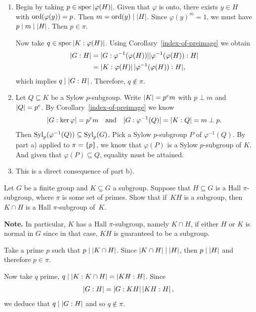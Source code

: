 \begin{solution}
\begin{enumerate}[\upshape a)]
    \item Begin by taking $p\in\operatorname{spec}\left\vert{\varphi(H)}\right\vert$. Given that $\varphi$ is onto, there exists $y\in H$ with ${\rm ord}(\varphi(y))=p$. Then $m={\rm ord}(y)\mid\left\vert{H}\right\vert$. Since $\varphi(y)^m=1$, we must have $p\mid m\mid\left\vert{H}\right\vert$. Then $p\in\pi$.

    
    Now take $q\in\operatorname{spec}\left\vert{K:\varphi(H)}\right\vert$. Using Corollary~\ref{index-of-preimage} we obtain
    \begin{align*}
        \left\vert{G:H}\right\vert &=|G:\varphi^{-1}(\varphi(H))||\varphi^{-1}(\varphi(H)):H|\\
            &= \left\vert{K:\varphi(H)}\right\vert|\varphi^{-1}(\varphi(H)):H|,
    \end{align*}
    which implies $q\mid\left\vert{G:H}\right\vert$. Therefore, $q\notin\pi$.
    
    \item Let $Q\subseteq K$ be a Sylow $p$-subgroup. Write $\left\vert{K}\right\vert=p^em$ with $p\perp m$ and $\left\vert{Q}\right\vert=p^e$. By Corollary~\ref{index-of-preimage} we know
    $$
        |G:\ker\varphi|=p^em\quad\text{and}\quad
            |G:\varphi^{-1}(Q)| = \left\vert{K:Q}\right\vert= m\perp p.
    $$
    Then ${\rm Syl}_p(\varphi^{-1}(Q))\subseteq{\rm Syl}_p(G)$. Pick a Sylow $p$-subgroup $P$ of $\varphi^{-1}(Q)$. By part a) applied to $\pi=\{p\}$, we know that $\varphi(P)$ is a Sylow $p$-subgroup of $K$. And given that $\varphi(P)\subseteq Q$, equality must be attained.
    
    \item This is a direct consequence of part b).
\end{enumerate}
\end{solution}

\begin{probl}\label{problem-1.B.6}
    Let $G$ be a finite group and\/ $K \subseteq G$ a subgroup. Suppose that\/ $H \subseteq G$ is a Hall\/ $\pi$-subgroup, where $\pi$ is some set of primes. Show that if\/~$KH$ is a subgroup, then $K \cap H$ is a Hall\/ $\pi$-subgroup of\/~$K$.

    \textrm{\upshape\textbf{Note.} In particular, $K$ has a Hall $\pi$-subgroup, namely $K\cap H$, if either $H$ or $K$ is normal in $G$ since in that case, $KH$ is guaranteed to be a subgroup.}
\end{probl}

\begin{solution} Take a prime $p$ such that $p\mid\left\vert{K\cap H}\right\vert$. Since $\left\vert{K\cap H}\right\vert\mid\left\vert{H}\right\vert$, then $p\mid\left\vert{H}\right\vert$ and therefore $p\in\pi$.

Now take $q$ prime, $q\mid\left\vert{K:K\cap H}\right\vert=\left\vert{KH:H}\right\vert$. Since
$$
    \left\vert{G:H}\right\vert=\left\vert{G:KH}\right\vert\left\vert{KH:H}\right\vert,
$$
we deduce that $q\mid\left\vert{G:H}\right\vert$ and so $q\notin\pi$.  \end{solution}

